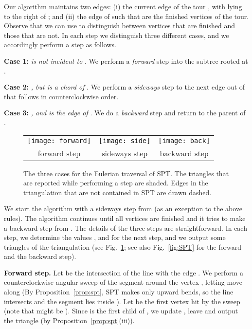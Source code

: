 \documentclass[11pt,a4paper]{article}
\begin{document}
Our algorithm maintains two edges: (i) the current edge of the tour ,
with  lying to the right of ; and
(ii) the edge  of  such that
 are the finished vertices of the tour.
Observe that we can use
  to distinguish between vertices that
are finished and those that are not.
In each step we distinguish three different cases,
and we accordingly perform a step as follows.

\textbf{Case 1:}
 \emph{ is not incident to }.
We perform a \emph{forward} step
into the subtree rooted at .

\textbf{Case 2:} \emph{,
but  is a chord of }.
We perform a \emph{sideways} step to the
next edge out of 
that follows  in counterclockwise order.

\textbf{Case 3:} \emph{, and  is the edge  of }. We do a \emph{backward} step and
return to the parent of .


\begin{figure}
\begin{center}
\begin{tabular}{ccc}
\texttt{[image: forward]} &
\texttt{[image: side]} &
\texttt{[image: back]}
\\
forward step & sideways step & backward step
\end{tabular}
\end{center}
\caption{The three cases for the Eulerian traversal of SPT. The triangles that are reported while performing a step are shaded. Edges in the triangulation that are not contained in SPT are drawn dashed.}
\label{fig:unimonotone-traversal}
\end{figure}


\noindent
We start the algorithm with
 a sideways step from
 (as an exception to the above rules).
The algorithm continues until all vertices are finished and it
tries to make a backward step from .
The details of the three steps are straightforward.
In each step, we determine the
values ,  and  for the next step, and we output some triangles
of the triangulation (see Fig.~\ref{fig:unimonotone-traversal}; see also
Fig.~\ref{fig:SPT} for the forward and the backward step).

\textbf{Forward step.}
Let  be the intersection of the line  with the
edge . We perform a counterclockwise angular sweep of the segment
 around the vertex , letting  move along
 (By Proposition~\ref{prop:spt}, SPT makes only
upward bends, so the line  intersects  and
the segment  lies inside ).
Let  be the first vertex hit by the sweep
(note that  might be ).
Since  is the first child of ,
we update , leave  and
output the triangle  (by Proposition~\ref{prop:spt}(iii)).
\end{document}
